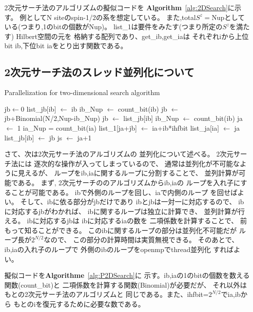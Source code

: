 \documentclass[prb,aps,showpacs,preprint,nofootinbib]{revtex4}
\newcommand{\lef}{\leftarrow}
\begin{document}
2次元サーチ法のアルゴリズムの擬似コードを
{\bf Algorithm}~\ref{alg:2DSearch}に示す。
例としてN siteのspin-1/2の系を想定している。
また,total$S^z=$Nupとしている(つまり,1のbitの個数がNup)。
list\_1は要件をみたす(つまり所定の$S^{z}$を満たす)
Hilbert空間の元を
格納する配列であり、get\_ib,get\_iaは
それぞれiから上位bit ib,下位bit iaをとり出す関数である。

\newpage
\subsection{2次元サーチ法のスレッド並列化について}
\label{sec:thread}

\begin{algorithm}                      
\caption{Parallelization for two-dimensional search algorithm}         
\label{alg1}                          
\begin{algorithmic}                  
\STATE jb$\lef 0$
  \STATE list\_jb[ib] $\lef$ ib
  \STATE ib\_Nup $\lef$ count\_bit(ib)
  \STATE jb $\lef$ jb+Binomial(N/2,Nup-ib\_Nup)
\ENDFOR
{}
  \STATE jb $\lef$ list\_jb[ib]
  \STATE ib\_Nup $\lef$ count\_bit(ib)
  \STATE ja $\lef$ 1 
    \STATE ia\_Nup = count\_bit(ia)
      \STATE list\_1[ja+jb] $\lef$ ia+ib*ihfbit
      \STATE list\_ja[ia] $\lef$ ja
      \STATE list\_jb[ib] $\lef$ jb
      \STATE js $\lef$ ja+1
    \ENDIF
  \ENDFOR
\ENDFOR
\end{algorithmic}
\label{alg:P2DSearch}
\end{algorithm}

さて、次は2次元サーチ法のアルゴリズムの
並列化について述べる。
2次元サーチ法には
逐次的な操作が入ってしまっているので、
通常は並列化が不可能なように見えるが、
ループをib,iaに関するループに分割することで、
並列計算が可能である。
まず, 2次元サーチののアルゴリズムからib,iaの
ループを入れ子にすることが可能である。
ibで外側のループを回し、iaで内側のループ
を回せばよい。
そして、ibに依る部分がjbだけであり
ibとjbは一対一に対応するので、
ibに対応するjbがわかれば、
ibに関するループは独立に計算でき、
並列計算が行える。
ibに対応するjbは
ibに対応するiaの数を
二項係数を計算することで、
前もって知ることができる。
このibに関するループの部分は並列化不可能だが
ループ長が$2^{N/2}$なので、
この部分の計算時間は実質無視できる。
そのあとで、ib,iaの入れ子のループで
外側のibのループをopenmpでthread並列化
すればよい。

擬似コードを{\bf Algorithme}~\ref{alg:P2DSearch}に
示す。ib,iaの1のbitの個数を数える関数(count\_bit)と
二項係数を計算する関数(Binomial)が必要だが、
それ以外はもとの2次元サーチ法のアルゴリズムと
同じである。また、ihfbit=$2^{N/2}$でia,ibから
もとのiを復元するために必要な数である。
\end{document}
